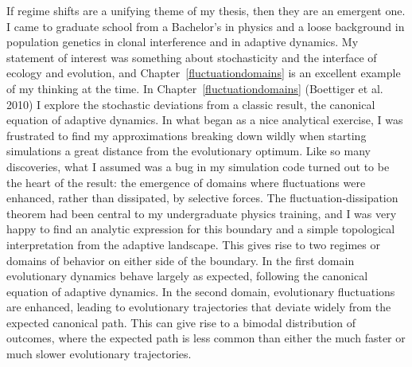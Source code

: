 If regime shifts are a unifying theme of my thesis, then they are an emergent one. I came to graduate school from a Bachelor's in physics and a loose background in population genetics in clonal interference and in adaptive dynamics.  My statement of interest was something about stochasticity and the interface of ecology and evolution, and Chapter~\ref{fluctuationdomains} is an excellent example of my thinking at the time.  In Chapter~\ref{fluctuationdomains} (Boettiger et al. 2010) I explore the stochastic deviations from a classic result, the canonical equation of adaptive dynamics.  In what began as a nice analytical exercise, I was frustrated to find my approximations breaking down wildly when starting simulations a great distance from the evolutionary optimum.  Like so many discoveries, what I assumed was a bug in my simulation code turned out to be the heart of the result: the emergence of domains where fluctuations were enhanced, rather than dissipated, by selective forces.  The fluctuation-dissipation theorem had been central to my undergraduate physics training, and I was very happy to find an analytic expression for this boundary and a simple topological interpretation from the adaptive landscape.   This gives rise to two regimes or domains of behavior on either side of the boundary.  In the first domain evolutionary dynamics behave largely as expected, following the canonical equation of adaptive dynamics.  In the second domain, evolutionary fluctuations are enhanced, leading to evolutionary trajectories that deviate widely from the expected canonical path.  This can give rise to a bimodal distribution of outcomes, where the expected path is less common than either the much faster or much slower evolutionary trajectories.   



